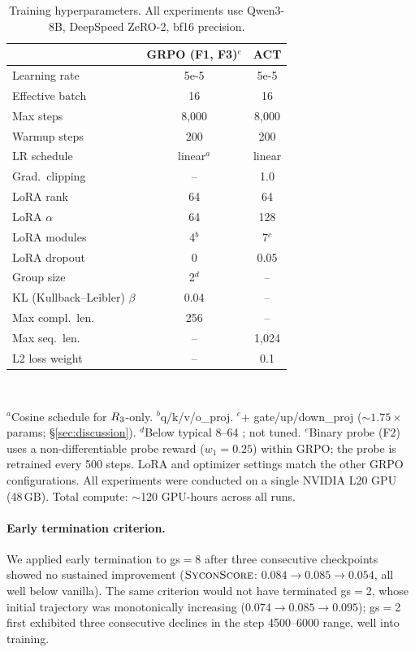 \begin{table}[h]
\centering
\small
\caption{Training hyperparameters. All experiments use Qwen3-8B, DeepSpeed ZeRO-2, bf16 precision.}
\label{tab:hyperparams}
\begin{tabular}{lcc}
\toprule
& GRPO (F1, F3)$^e$ & ACT \\
\midrule
Learning rate & 5e-5 & 5e-5 \\
Effective batch & 16 & 16 \\
Max steps & 8{,}000 & 8{,}000 \\
Warmup steps & 200 & 200 \\
LR schedule & linear$^a$ & linear \\
Grad.\ clipping & -- & 1.0 \\
\midrule
LoRA rank & 64 & 64 \\
LoRA $\alpha$ & 64 & 128 \\
LoRA modules & 4$^b$ & 7$^c$ \\
LoRA dropout & 0 & 0.05 \\
\midrule
Group size & 2$^d$ & -- \\
KL (Kullback--Leibler) $\beta$ & 0.04 & -- \\
Max compl.\ len. & 256 & -- \\
Max seq.\ len. & -- & 1{,}024 \\
L2 loss weight & -- & 0.1 \\
\bottomrule
\end{tabular}
\\[2pt]
\raggedright\footnotesize
$^a$Cosine schedule for $R_3$-only.
$^b$q/k/v/o\_proj.
$^c$+ gate/up/down\_proj (${\sim}1.75{\times}$ params; \S\ref{sec:discussion}).
$^d$Below typical 8--64 \citep{shao2024grpo}; not tuned.
$^e$Binary probe (F2) uses a non-differentiable probe reward ($w_1{=}0.25$) within GRPO; the probe is retrained every 500 steps. LoRA and optimizer settings match the other GRPO configurations.
All experiments were conducted on a single NVIDIA L20 GPU (48\,GB). Total compute: ${\sim}$120 GPU-hours across all runs.
\end{table}

\paragraph{Early termination criterion.}
We applied early termination to gs$=$8 after three consecutive checkpoints showed no sustained improvement ($\textsc{SyconScore}$: $0.084{\to}0.085{\to}0.054$, all well below vanilla).
The same criterion would not have terminated gs$=$2, whose initial trajectory was monotonically increasing ($0.074{\to}0.085{\to}0.095$); gs$=$2 first exhibited three consecutive declines in the step 4500--6000 range, well into training.

